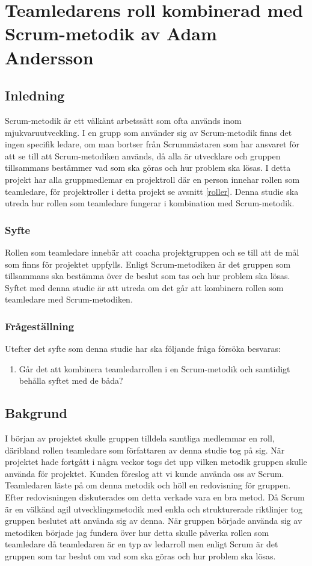 \chapter{Teamledarens roll kombinerad med Scrum-metodik av Adam Andersson}

\section{Inledning}
Scrum-metodik är ett välkänt arbetssätt som ofta används inom mjukvaruutveckling. I en grupp som använder sig av Scrum-metodik finns det ingen specifik ledare, om man bortser från Scrummästaren som har ansvaret för att se till att Scrum-metodiken används, då alla är utvecklare och gruppen tillsammans bestämmer vad som ska göras och hur problem ska lösas.
I detta projekt har alla gruppmedlemar en projektroll där en person innehar rollen som teamledare, för projektroller i detta projekt se avsnitt \ref{roller}. Denna studie ska utreda hur rollen som teamledare fungerar i kombination med Scrum-metodik.

\subsection{Syfte}
Rollen som teamledare innebär att coacha projektgruppen och se till att de mål som finns för projektet uppfylls. Enligt Scrum-metodiken är det gruppen som tillsammans ska bestämma över de beslut som tas och hur problem ska lösas. Syftet med denna studie är att utreda om det går att kombinera rollen som teamledare med Scrum-metodiken.

\subsection{Frågeställning}
Utefter det syfte som denna studie har ska följande fråga försöka besvaras:

\begin{enumerate}
	\item Går det att kombinera teamledarrollen i en Scrum-metodik och samtidigt behålla syftet med de båda? 
\end{enumerate}

\section{Bakgrund}
I början av projektet skulle gruppen tilldela samtliga medlemmar en roll, däribland rollen teamledare som författaren av denna studie tog på sig. När projektet hade fortgått i några veckor togs det upp vilken metodik gruppen skulle använda för projektet. Kunden föreslog att vi kunde använda oss av Scrum. Teamledaren läste på om denna metodik och höll en redovisning för gruppen. Efter redovisningen diskuterades om detta verkade vara en bra metod. Då Scrum är en välkänd agil utvecklingsmetodik med enkla och strukturerade riktlinjer tog gruppen beslutet att använda sig av denna. När gruppen började använda sig av metodiken började jag fundera över hur detta skulle påverka rollen som teamledare då teamledaren är en typ av ledarroll men enligt Scrum är det gruppen som tar beslut om vad som ska göras och hur problem ska lösas.

